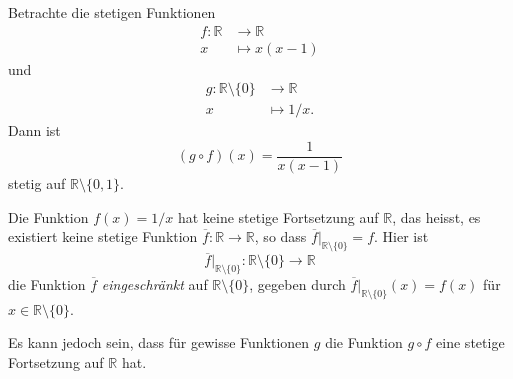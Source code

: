 \documentclass[../main.tex]{subfiles}
\begin{document}
\begin{example}
  Betrachte die stetigen Funktionen
  \begin{align*}
    f \colon \mathbb{R} & \to \mathbb{R} \\
    x & \mapsto x(x-1)
  \end{align*}
  und
  \begin{align*}
    g \colon \mathbb{R} \setminus \{0\} & \to \mathbb{R} \\
     x & \mapsto 1/x.
  \end{align*}
  Dann ist
  \[
    (g \circ f)(x) = \frac{1}{x(x-1)}
  \]
  stetig auf $\mathbb{R} \setminus \{0, 1\}$.
\end{example}


\begin{remark}
  Die Funktion $f(x) = 1/x$ hat keine
  stetige Fortsetzung auf $\mathbb{R}$,
  das heisst, es existiert keine stetige
  Funktion $\overline f \colon \mathbb{R} \to \mathbb{R}$,
  so dass $\overline f |_{\mathbb{R} \setminus \{0\}} = f$.
  Hier ist \[\overline f |_{\mathbb{R} \setminus\{0\}}
  \colon \mathbb{R} \setminus \{0\} \to \mathbb{R}\]
  die Funktion $\overline f$ \emph{eingeschränkt} auf
  $\mathbb{R} \setminus \{0\}$, 
  gegeben durch 
  $\overline f|_{\mathbb{R} \setminus \{0\}}(x) =f(x) $
  für $x \in \mathbb{R} \setminus \{0\}$.
\end{remark}

Es kann jedoch sein, dass für gewisse
Funktionen $g$ die Funktion
$g \circ f$ eine stetige Fortsetzung auf $\mathbb{R}$ hat.
\end{document}
